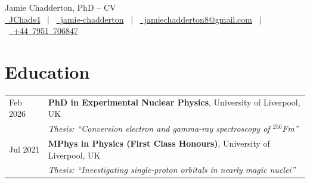\documentclass[a4paper,11pt]{article}
\begin{document}
\pagestyle{empty}

\begin{center}
    {\LARGE Jamie Chadderton, PhD -- CV} \\[10pt]
    \href{https://github.com/JChads4}{\raisebox{-0.05\height}\faGithub\ JChads4} \ $|$ \
    \href{https://www.linkedin.com/in/jamie-chadderton-a5597b17b/}{\raisebox{-0.05\height}\faLinkedin\ jamie-chadderton} \ $|$ \
    \href{mailto:jamiechadderton8@gmail.com}{\raisebox{-0.05\height}\faEnvelope\ jamiechadderton8@gmail.com} \ $|$ \
    \href{tel:+447951706847}{\raisebox{-0.05\height}\faPhone*\ +44\ 7951\ 706847}
\end{center}

\section{Education}
\begin{tabularx}{\linewidth}{@{}l X@{}}
Feb 2026 & \textbf{PhD in Experimental Nuclear Physics}, University of Liverpool, UK \\
& \emph{Thesis: ``Conversion electron and gamma-ray spectroscopy of $^{250}$Fm''} \\[4pt]
Jul 2021 & \textbf{MPhys in Physics (First Class Honours)}, University of Liverpool, UK \\
& \emph{Thesis: ``Investigating single-proton orbitals in nearly magic nuclei''}
\end{tabularx}

\end{document}
